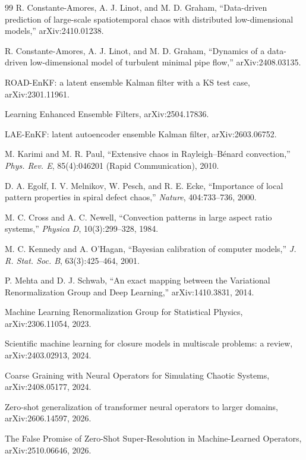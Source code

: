 \documentclass[11pt]{article}
\begin{document}
\begin{thebibliography}{99}
 R. Constante-Amores, A. J. Linot, and
M. D. Graham, ``Data-driven prediction of large-scale spatiotemporal
chaos with distributed low-dimensional models,'' arXiv:2410.01238.

 R. Constante-Amores, A. J. Linot, and
M. D. Graham, ``Dynamics of a data-driven low-dimensional model of
turbulent minimal pipe flow,'' arXiv:2408.03135.

 ROAD-EnKF: a latent ensemble Kalman filter with a
KS test case, arXiv:2301.11961.

 Learning Enhanced Ensemble Filters,
arXiv:2504.17836.

 LAE-EnKF: latent autoencoder ensemble Kalman filter,
arXiv:2603.06752.

 M. Karimi and M. R. Paul, ``Extensive chaos in
Rayleigh--B\'enard convection,'' \emph{Phys. Rev. E}, 85(4):046201 (Rapid
Communication), 2010.

 D. A. Egolf, I. V. Melnikov, W. Pesch, and R. E.
Ecke, ``Importance of local pattern properties in spiral defect
chaos,'' \emph{Nature}, 404:733--736, 2000.

 M. C. Cross and A. C. Newell, ``Convection
patterns in large aspect ratio systems,'' \emph{Physica D},
10(3):299--328, 1984.

 M. C. Kennedy and A. O'Hagan, ``Bayesian
calibration of computer models,'' \emph{J. R. Stat. Soc. B},
63(3):425--464, 2001.

 P. Mehta and D. J. Schwab, ``An exact mapping
between the Variational Renormalization Group and Deep Learning,''
arXiv:1410.3831, 2014.

 Machine Learning Renormalization Group for
Statistical Physics, arXiv:2306.11054, 2023.

 Scientific machine learning for closure
models in multiscale problems: a review, arXiv:2403.02913, 2024.

 Coarse Graining with Neural Operators
for Simulating Chaotic Systems, arXiv:2408.05177, 2024.

 Zero-shot generalization of
transformer neural operators to larger domains, arXiv:2606.14597, 2026.

 The False Promise of Zero-Shot
Super-Resolution in Machine-Learned Operators, arXiv:2510.06646, 2026.


\end{thebibliography}
\end{document}
